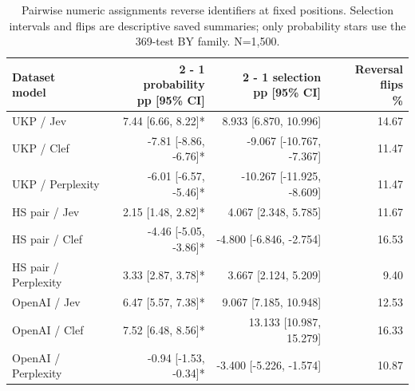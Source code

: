 \begin{table}[t]
\centering\footnotesize
\setlength{\tabcolsep}{3.5pt}
\begin{tabular}{@{}lrrr@{}}
\toprule
\shortstack[l]{Dataset\\{}model} & \shortstack[l]{2 - 1 probability\\{}pp [95\% CI]} & \shortstack[l]{2 - 1 selection\\{}pp [95\% CI]} & \shortstack[l]{Reversal flips\\{}\%} \\
\midrule
UKP / Jev & 7.44 [6.66, 8.22]* & 8.933 [6.870, 10.996] & 14.67 \\
UKP / Clef & -7.81 [-8.86, -6.76]* & -9.067 [-10.767, -7.367] & 11.47 \\
UKP / Perplexity & -6.01 [-6.57, -5.46]* & -10.267 [-11.925, -8.609] & 11.47 \\
HS pair / Jev & 2.15 [1.48, 2.82]* & 4.067 [2.348, 5.785] & 11.67 \\
HS pair / Clef & -4.46 [-5.05, -3.86]* & -4.800 [-6.846, -2.754] & 16.53 \\
HS pair / Perplexity & 3.33 [2.87, 3.78]* & 3.667 [2.124, 5.209] & 9.40 \\
OpenAI / Jev & 6.47 [5.57, 7.38]* & 9.067 [7.185, 10.948] & 12.53 \\
OpenAI / Clef & 7.52 [6.48, 8.56]* & 13.133 [10.987, 15.279] & 16.33 \\
OpenAI / Perplexity & -0.94 [-1.53, -0.34]* & -3.400 [-5.226, -1.574] & 10.87 \\
\bottomrule
\end{tabular}
\caption{Pairwise numeric assignments reverse identifiers at fixed positions. Selection intervals and flips are descriptive saved summaries; only probability stars use the 369-test BY family. N=1,500.}
\label{tab:appendix_numeric_pair}
\end{table}
